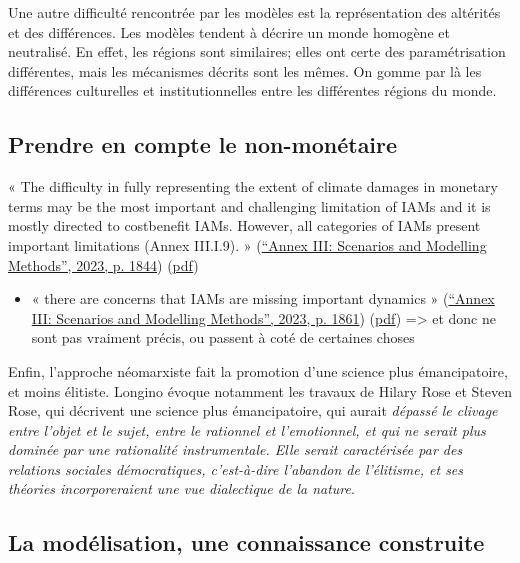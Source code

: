 Une autre difficulté rencontrée par les modèles est la représentation des altérités et des différences. Les modèles tendent à décrire un monde homogène et neutralisé. En effet, les régions sont similaires; elles ont certe des paramétrisation différentes, mais les mécanismes décrits sont les mêmes. On gomme par là les différences culturelles et institutionnelles entre les différentes régions du monde. \\

 \subsection{Prendre en compte le non-monétaire}


« The difficulty in fully representing the extent of climate damages in monetary terms may be the most important and challenging limitation of IAMs and it is mostly directed to costbenefit IAMs. However, all categories of IAMs present important limitations (Annex III.I.9). » (\href{zotero://select/library/items/2SDDNUUF}{“Annex III: Scenarios and Modelling Methods”, 2023, p. 1844}) (\href{zotero://open-pdf/library/items/CHVFSLLH?page=4&annotation=YT933ZM4}{pdf})
 

\begin{itemize}
    \item « there are concerns that IAMs are missing important dynamics » (\href{zotero://select/library/items/2SDDNUUF}{“Annex III: Scenarios and Modelling Methods”, 2023, p. 1861}) (\href{zotero://open-pdf/library/items/CHVFSLLH?page=21&annotation=WDMBNU3A}{pdf})
=> et donc ne sont pas vraiment précis, ou passent à coté de certaines choses

\end{itemize}


Enfin, l'approche néomarxiste fait la promotion d'une science plus émancipatoire, et moins élitiste. Longino évoque notamment les travaux de Hilary Rose et Steven Rose, qui décrivent une science plus émancipatoire, qui aurait \emph{dépassé le clivage entre l'objet et le sujet, entre le rationnel et l'emotionnel, et qui ne serait plus dominée par une rationalité instrumentale. Elle serait caractérisée par des relations sociales démocratiques, c'est-à-dire l'abandon de l'élitisme, et ses théories incorporeraient une vue dialectique de la nature}.



 \subsection{La modélisation, une connaissance construite}

